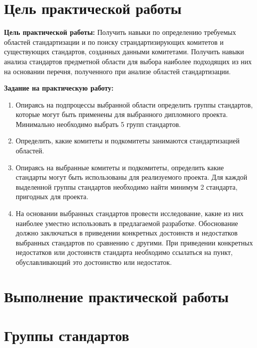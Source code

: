 \section*{\LARGE Цель практической работы}

\textbf{Цель практической работы:}
Получить навыки по определению требуемых областей
стандартизации и по поиску страндартизирующих комитетов и
существующих стандартов, созданных данными комитетами. Получить
навыки анализа стандартов предметной области для выбора наиболее
подходящих из них на основании перечня, полученного при анализе
областей стандартизации.

\textbf{Задание на практическую работу:}

\begin{enumerate}
	\item Опираясь на подпроцессы выбранной области определить
		группы стандартов, которые могут быть применены
		для выбранного дипломного проекта.
		Минимально необходимо выбрать 5 групп стандартов.
	\item Определить, какие комитеты и подкомитеты занимаются
		стандартизацией областей.
	\item Опираясь на выбранные комитеты и подкомитеты,
		определить какие стандарты могут быть использованы
		для реализуемого проекта.
		Для каждой выделенной группы стандартов необходимо
		найти минимум 2 стандарта, пригодных для проекта.
	\item На основании выбранных стандартов провести исследование,
		какие из них наиболее уместно использовать в предлагаемой разработке.
		Обоснование должно заключаться в приведении конкретных достоинств
		и недостатков выбранных стандартов по сравнению с другими.
		При приведении конкретных недостатков или достоинств стандарта
		необходимо ссылаться на пункт,
		обуславливающий это достоинство или недостаток.
\end{enumerate}

\clearpage

\section*{\LARGE Выполнение практической работы}

\section{Группы стандартов}

